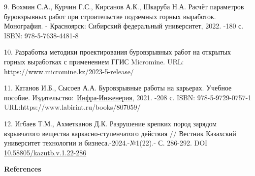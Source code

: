 \begin{references}
9. Вохмин С.А., Курчин Г.С., Кирсанов А.К., Шкаруба Н.А. Расчёт
  параметров буровзрывных работ при строительстве подземных горных
  выработок. Монография. - Красноярск: Сибирский федеральный
  университет, 2022. -180 с. ISBN: 978-5-7638-4481-8

10. Разработка методики проектирования буровзрывных работ на открытых
  горных выработках с применением ГГИС Micromine. URL:
  {https://www.micromine.kz/2023-5-release/}

11. Катанов И.Б., Сысоев А.А. Буровзрывные работы на карьерах. Учебное
  пособие.   Издательство:\linebreak ~\href{https://www.labirint.ru/pubhouse/2357/}{Инфра-Инженерия},
  2021. -208 с. ISBN: 978-5-9729-0757-1 URL:{https://www.labirint.ru/books/807059/}

12. Игбаев Т.М., Ахметканов Д.К. Разрушение крепких пород зарядом
взрывчатого вещества каркасно-ступенчатого действия // Вестник Казахский
университет технологии и бизнеса.-2024.-№1(22).- С. 286-292. DOI
\href{https://doi.org/10.58805/kazutb.v.1.22-286}{10.58805/kazutb.v.1.22-286}

\end{references}

\begin{center}
{\bfseries References}
\end{center}

